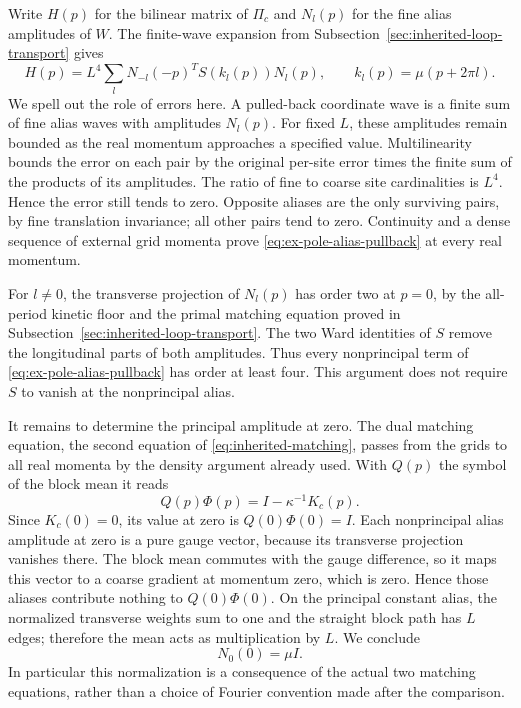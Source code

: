 Write $H(p)$ for the bilinear matrix of $\Pi_c$ and $N_l(p)$
for the fine alias amplitudes of $W$. The finite-wave expansion
from Subsection~\ref{sec:inherited-loop-transport} gives
\begin{equation}\label{eq:ex-pole-alias-pullback}
 H(p)=L^4\sum_l N_{-l}(-p)^T S(k_l(p))N_l(p),
                  \qquad k_l(p)=\mu(p+2\pi l).
\end{equation}
We spell out the role of errors here. A pulled-back coordinate wave
is a finite sum of fine alias waves with amplitudes $N_l(p)$.
For fixed $L$, these amplitudes remain bounded as the real momentum
approaches a specified value. Multilinearity bounds the error on
each pair by the original per-site error times the finite sum of
the products of its amplitudes. The ratio of fine to coarse site
cardinalities is $L^4$. Hence the error still tends to zero.
Opposite aliases are the only surviving pairs, by fine translation
invariance; all other pairs tend to zero. Continuity and a dense
sequence of external grid momenta prove
\eqref{eq:ex-pole-alias-pullback} at every real momentum.

For $l\ne0$, the transverse projection of $N_l(p)$ has order two
at $p=0$, by the all-period kinetic floor and the primal matching
equation proved in
Subsection~\ref{sec:inherited-loop-transport}. The two Ward
identities of $S$ remove the longitudinal parts of both amplitudes.
Thus every nonprincipal term of
\eqref{eq:ex-pole-alias-pullback} has order at least four. This
argument does not require $S$ to vanish at the nonprincipal alias.

It remains to determine the principal amplitude at zero. The dual
matching equation, the second equation of
\eqref{eq:inherited-matching}, passes from the grids to all real
momenta by the density argument already used. With $Q(p)$ the symbol
of the block mean it reads
\[
                  Q(p)\Phi(p)=I-\kappa^{-1}K_c(p).
\]
Since $K_c(0)=0$, its value at zero is $Q(0)\Phi(0)=I$.
Each nonprincipal alias amplitude at zero is a pure gauge vector,
because its transverse projection vanishes there. The block mean
commutes with the gauge difference, so it maps this vector to a
coarse gradient at momentum zero, which is zero. Hence those
aliases contribute nothing to $Q(0)\Phi(0)$. On the principal
constant alias, the normalized transverse weights sum to one and
the straight block path has $L$ edges; therefore the mean acts
as multiplication by $L$. We conclude
\begin{equation}\label{eq:ex-principal-amplitude}
                              N_0(0)=\mu I.
\end{equation}
In particular this normalization is a consequence of the actual
two matching equations, rather than a choice of Fourier convention
made after the comparison.

